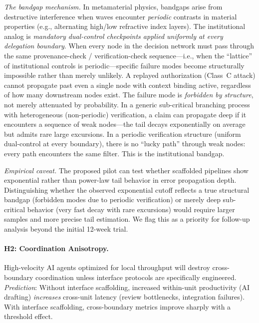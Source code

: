 \documentclass[runningheads]{llncs}
\begin{document}
\emph{The bandgap mechanism.} In metamaterial physics, bandgaps arise from destructive interference when waves encounter \emph{periodic} contrasts in material properties (e.g., alternating high/low refractive index layers). The institutional analog is \emph{mandatory dual-control checkpoints applied uniformly at every delegation boundary}. When every node in the decision network must pass through the same provenance-check / verification-check sequence---i.e., when the ``lattice'' of institutional controls is periodic---specific failure modes become structurally impossible rather than merely unlikely. A replayed authorization (Class~C attack) cannot propagate past even a single node with context binding active, regardless of how many downstream nodes exist. The failure mode is \emph{forbidden by structure}, not merely attenuated by probability. In a generic sub-critical branching process with heterogeneous (non-periodic) verification, a claim can propagate deep if it encounters a sequence of weak nodes---the tail decays exponentially on average but admits rare large excursions. In a periodic verification structure (uniform dual-control at every boundary), there is no ``lucky path'' through weak nodes: every path encounters the same filter. This is the institutional bandgap.

\emph{Empirical caveat.} The proposed pilot can test whether scaffolded pipelines show exponential rather than power-law tail behavior in error propagation depth. Distinguishing whether the observed exponential cutoff reflects a true structural bandgap (forbidden modes due to periodic verification) or merely deep sub-critical behavior (very fast decay with rare excursions) would require larger samples and more precise tail estimation. We flag this as a priority for follow-up analysis beyond the initial 12-week trial.

\paragraph{H2: Coordination Anisotropy.}
High-velocity AI agents optimized for local throughput will destroy cross-boundary coordination unless interface protocols are specifically engineered. \emph{Prediction}: Without interface scaffolding, increased within-unit productivity (AI drafting) \emph{increases} cross-unit latency (review bottlenecks, integration failures). With interface scaffolding, cross-boundary metrics improve sharply with a threshold effect.
\end{document}
